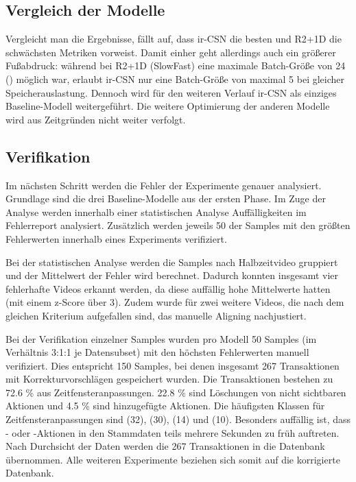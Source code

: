\subsection{Vergleich der Modelle}
\label{subsec:vergleich-der-modelle}

Vergleicht man die Ergebnisse, fällt auf, dass ir-CSN die besten und R2+1D die schwächsten Metriken vorweist.
Damit einher geht allerdings auch ein größerer Fußabdruck:
während bei R2+1D (\bzw SlowFast) eine maximale Batch-Größe von 24 () möglich war, erlaubt ir-CSN nur eine Batch-Größe von maximal 5 bei gleicher Speicherauslastung.
Dennoch wird für den weiteren Verlauf ir-CSN als einziges Baseline-Modell weitergeführt.
Die weitere Optimierung der anderen Modelle wird aus Zeitgründen nicht weiter verfolgt.

\subsection{Verifikation}
\label{sec:verifikation}

Im nächsten Schritt werden die Fehler der Experimente genauer analysiert.
Grundlage sind die drei Baseline-Modelle aus der ersten Phase.
Im Zuge der Analyse werden innerhalb einer statistischen Analyse Auffälligkeiten im Fehlerreport analysiert.
Zusätzlich werden jeweils 50 der Samples mit den größten Fehlerwerten innerhalb eines Experiments verifiziert.

Bei der statistischen Analyse werden die Samples nach Halbzeitvideo gruppiert und der Mittelwert der Fehler wird berechnet.
Dadurch konnten insgesamt vier fehlerhafte Videos erkannt werden, da diese auffällig hohe Mittelwerte hatten (mit einem z-Score über 3).
Zudem wurde für zwei weitere Videos, die nach dem gleichen Kriterium aufgefallen sind, das manuelle Aligning nachjustiert.

Bei der Verifikation einzelner Samples wurden pro Modell 50 Samples (im Verhältnis 3:1:1 je Datensubset) mit den höchsten Fehlerwerten manuell verifiziert.
Dies entspricht 150 Samples, bei denen insgesamt 267 Transaktionen mit Korrekturvorschlägen gespeichert wurden.
Die Transaktionen bestehen zu 72.6 \% aus Zeitfensteranpassungen.
22.8 \% sind Löschungen von nicht sichtbaren Aktionen und 4.5 \% sind hinzugefügte Aktionen.
Die häufigsten Klassen für Zeitfensteranpassungen sind  (32),  (30),  (14) und  (10).
Besonders auffällig ist, dass \zB {}- oder -Aktionen in den Stammdaten teils mehrere Sekunden zu früh auftreten.
Nach Durchsicht der Daten werden die 267 Transaktionen in die Datenbank übernommen.
Alle weiteren Experimente beziehen sich somit auf die korrigierte Datenbank.

